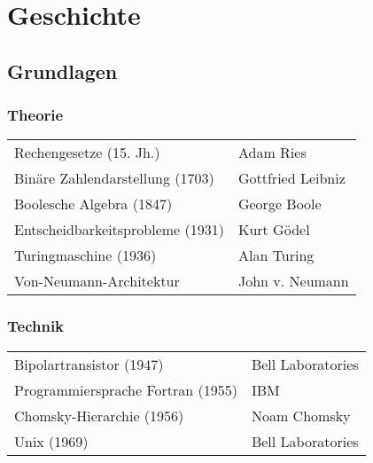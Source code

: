 \section{Geschichte}

\subsection{Grundlagen}
\subsubsection{Theorie}
\settowidth{\MyLenA}{Entscheidbarkeitsprobleme (1931)~~}
\begin{tabular}{@{}p{\the\MyLenA}%
				@{}p{\linewidth-\the\MyLenA}}
	Rechengesetze (15. Jh.) & Adam Ries\\
	Binäre Zahlendarstellung (1703) & Gottfried Leibniz\\
	Boolesche Algebra (1847)	& George Boole\\
	Entscheidbarkeitsprobleme (1931) & Kurt Gödel\\
	Turingmaschine (1936)	& Alan Turing\\
	Von-Neumann-Architektur & John v. Neumann\\
\end{tabular}

\subsubsection{Technik}
\settowidth{\MyLenA}{Programmiersprache Fortran (1955)~~}
\begin{tabular}{@{}p{\the\MyLenA}%
				@{}p{\linewidth-\the\MyLenA}}
	Bipolartransistor (1947) & Bell Laboratories\\
	Programmiersprache Fortran (1955) & IBM\\
	Chomsky-Hierarchie	(1956) & Noam Chomsky\\
	Unix (1969) & Bell Laboratories\\
\end{tabular}

